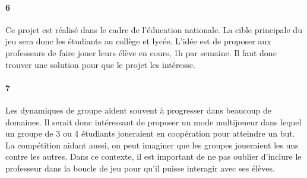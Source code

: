 \paragraph{6}Ce projet est réalisé dans le cadre de l'éducation nationale. La cible principale du jeu sera donc les étudiants au collège et lycée. L'idée est de proposer aux professeurs de
faire jouer leurs élève en cours, 1h par semaine. Il faut donc trouver une solution pour que le projet les intéresse.
\paragraph{7}Les dynamiques de groupe aident souvent à progresser dans beaucoup de domaines. Il serait donc intéressant de proposer un mode multijoueur dans lequel un groupe de 3 ou 4
étudiants joueraient en coopération pour atteindre un but. La compétition aidant aussi, on peut imaginer que les groupes joueraient les uns contre les autres. Dans ce contexte, il est
important de ne pas oublier d'inclure le professeur dans la boucle de jeu pour qu'il puisse interagir avec ses élèves.